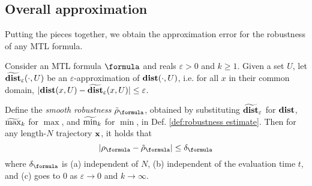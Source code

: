 \subsection{Overall approximation}
\label{sec:overall apx}
Putting the pieces together, we obtain the approximation error for the robustness of any MTL formula.
\begin{theorem}
	\label{thm:total apx error}
	Consider an MTL formula $\formula$ and reals $\varepsilon > 0$ and $k \geq 1$. 
	Given a set $U$, let $\widetilde{\mathbf{dist}}_\varepsilon(\cdot,U)$ be an $\varepsilon$-approximation of $\mathbf{dist}(\cdot,U)$, i.e. for all $x$ in their common domain, $|\mathbf{dist}(x,U) - \widetilde{\mathbf{dist}}_\varepsilon(x,U)| \leq \varepsilon$.	
	
	Define the \textit{smooth robustness} $\srobf$, obtained by substituting $\widetilde{\mathbf{dist}}_{\varepsilon}$ for $\mathbf{dist}$, $\widetilde{\max}_k$ for $\max$, and $\widetilde{\min}_k$ for $\min$, in Def. \ref{def:robustness estimate}.
	Then for any length-$N$ trajectory $\mathbf{x}$, it holds that
	\[|\robf-\srobf| \leq \delta_\formula\]
	where $\delta_\formula$ is
	(a) independent of $N$,
	(b) independent of the evaluation time $t$, and 
	(c) goes to 0 as $\varepsilon \rightarrow 0$ and $k \rightarrow \infty$.
\end{theorem}
